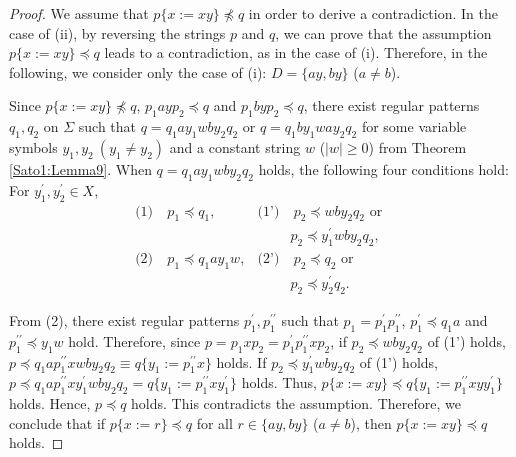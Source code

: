 \begin{proof}
We assume that $p \{ x := xy \} \not \preceq q$ in order to derive a contradiction.
In the case of \textrm{(ii)}, by reversing the strings $p$ and $q$, we can prove that the assumption $p \{ x := xy \} \preceq q$ leads to a contradiction, as in the case of \textrm{(i)}.
Therefore, in the following, we consider only the case of \textrm{(i)}: $D=\{ ay, by \}$ ($a \not= b$).

Since $p \{ x := xy \} \not \preceq q$, $p_{1}ayp_{2}\preceq q$ and $p_{1}byp_{2}\preceq q$, 
there exist regular patterns $q_{1},q_{2}$ on $\Sigma$ such that $q=q_{1}ay_{1}wby_{2}q_{2}$ or $q=q_{1}by_{1}way_{2}q_{2}$ for some variable symbols $y_{1},y_{2}~(y_{1} \not= y_{2})$ and a constant string $w$ ($|w|\geq 0$) from Theorem \ref{Sato1:Lemma9}.
When $q=q_{1}ay_{1}wby_{2}q_{2}$ holds, the following four conditions hold: For $y_{1}^{\prime}, y_{2}^{\prime}\in X$,
\begin{align*}
\textrm{(1)} & ~p_{1} \preceq q_{1}, & \textrm{(1')} & ~p_{2} \preceq wby_{2}q_{2} \mbox{ or }\\
& & & p_{2} \preceq y_{1}^{\prime}wby_{2}q_{2},\\
\textrm{(2)} & ~p_{1} \preceq q_{1}ay_{1}w, & \textrm{(2')} & ~p_{2} \preceq q_{2} \mbox{ or }\\
& & & p_{2} \preceq y_{2}^{\prime}q_{2}.
\end{align*}

From (2), there exist regular patterns $p_{1}^{\prime},p_{1}^{\prime\prime}$ such that $p_{1}=p_{1}^{\prime}p_{1}^{\prime\prime}$, $p_{1}^{\prime} \preceq q_{1}a$ and $p_{1}^{\prime\prime} \preceq y_{1}w$ hold.
Therefore, since $p=p_{1}xp_{2}=p_{1}^{\prime}p_{1}^{\prime\prime}xp_{2}$,
if $p_{2} \preceq wby_{2}q_{2}$ of (1') holds, 
$p\preceq q_{1}ap_{1}^{\prime\prime}xwby_{2}q_{2}\equiv q \{ y_{1} := p_{1}^{\prime\prime}x \}$ holds.
If $p_2\preceq y_{1}^{\prime}wby_{2}q_{2}$ of (1') holds, $p\preceq q_{1}ap_{1}^{\prime\prime}xy_{1}^{\prime}wby_{2}q_{2}=q \{ y_{1} := p_{1}^{\prime\prime}xy_{1}^{\prime} \}$ holds.
Thus, $p\{x := xy\} \preceq q \{ y_{1} := p_{1}^{\prime\prime}xyy_{1}^{\prime} \}$ holds.
Hence, $p \preceq q$ holds.
This contradicts the assumption.
Therefore, we conclude that if $p \{ x := r \} \preceq q$ for all $r \in \{ ay, by \}$ ($a \not= b$), then $p \{ x := xy \} \preceq q$ holds.
\end{proof}

